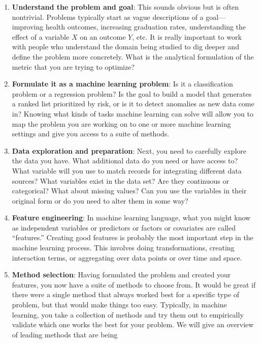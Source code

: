 \documentclass[]{krantz}
\begin{document}
\begin{enumerate}
\def\labelenumi{\arabic{enumi}.}
\item
  \textbf{Understand the problem and goal}: This sounds obvious but is
  often nontrivial. Problems typically start as vague descriptions of a
  goal---improving health outcomes, increasing graduation rates,
  understanding the effect of a variable \(X\) on an outcome \(Y\), etc.
  It is really important to work with people who understand the domain
  being studied to dig deeper and define the problem more concretely.
  What is the analytical formulation of the metric that you are trying
  to optimize?
\item
  \textbf{Formulate it as a machine learning problem}: Is it a
  classification problem or a regression problem? Is the goal to build a
  model that generates a ranked list prioritized by risk, or is it to
  detect anomalies as new data come in? Knowing what kinds of tasks
  machine learning can solve will allow you to map the problem you are
  working on to one or more machine learning settings and give you
  access to a suite of methods.
\item
  \textbf{Data exploration and preparation}: Next, you need to carefully
  explore the data you have. What additional data do you need or have
  access to? What variable will you use to match records for integrating
  different data sources? What variables exist in the data set? Are they
  continuous or categorical? What about missing values? Can you use the
  variables in their original form or do you need to alter them in some
  way?
\item
  \textbf{Feature engineering}: In machine learning language, what you
  might know as independent variables or predictors or factors or
  covariates are called ``features.'' Creating good features is probably
  the most important step in the machine learning process. This involves
  doing transformations, creating interaction terms, or aggregating over
  data points or over time and space.
\item
  \textbf{Method selection}: Having formulated the problem and created
  your features, you now have a suite of methods to choose from. It
  would be great if there were a single method that always worked best
  for a specific type of problem, but that would make things too easy.
  Typically, in machine learning, you take a collection of methods and
  try them out to empirically validate which one works the best for your
  problem. We will give an overview of leading methods that are being

\end{enumerate}
\end{document}
